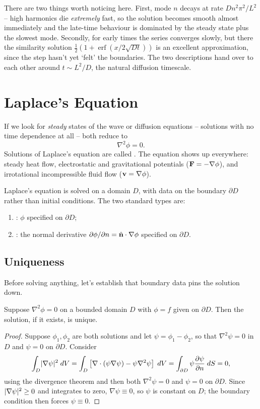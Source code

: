 \documentclass[a4paper]{scrartcl}
\newcommand{\erf}{\operatorname{erf}}
\begin{document}
There are two things worth noticing here. First, mode $n$ decays at rate $D n^2 \pi^2/L^2$ -- high harmonics die \emph{extremely} fast, so the solution becomes smooth almost immediately and the late-time behaviour is dominated by the steady state plus the slowest mode. Secondly, for early times the series converges slowly, but there the similarity solution $\frac{1}{2}\left(1 + \erf \left(x/2\sqrt{Dt}\right)\right)$ is an excellent approximation, since the step hasn't yet `felt' the boundaries. The two descriptions hand over to each other around $t \sim L^2/D$, the natural diffusion timescale.

\section{Laplace's Equation}

If we look for \emph{steady} states of the wave or diffusion equations -- solutions with no time dependence at all -- both reduce to 
$$
\nabla^2 \phi = 0.
$$
Solutions of Laplace's equation are called . The equation shows up everywhere: steady heat flow, electrostatic and gravitational potentials ($\mathbf{F} = -\nabla \phi$), and irrotational incompressible fluid flow ($\mathbf{v} = \nabla \phi$).

Laplace's equation is solved on a domain $D$, with data on the boundary $\partial D$ rather than initial conditions. The two standard types are:
\begin{enumerate}[label=(\roman*)]
    \item {}: $\phi$ specified on $\partial D$;
    \item {}: the normal derivative $\partial \phi / \partial n = \hat{\mathbf{n}} \cdot \nabla \phi$ specified on $\partial D$.
\end{enumerate}

\subsection{Uniqueness}

Before solving anything, let's establish that boundary data pins the solution down.

\begin{theorem}
    Suppose $\nabla^2 \phi = 0$ on a bounded domain $D$ with $\phi = f$ given on $\partial D$. Then the solution, if it exists, is unique.
\end{theorem}
\begin{proof}
    Suppose $\phi_1, \phi_2$ are both solutions and let $\psi = \phi_1 - \phi_2$, so that $\nabla^2 \psi = 0$ in $D$ and $\psi = 0$ on $\partial D$.
    Consider
    $$
    \int_D \lvert\nabla \psi\rvert^2 \; d V = \int_D \left[\nabla \cdot (\psi \nabla \psi) - \psi \nabla^2 \psi \right]\; d V = \int_{\partial D} \psi \frac{\partial \psi}{\partial n} \; d S = 0,
    $$
    using the divergence theorem and then both $\nabla^2 \psi = 0$ and $\psi = 0$ on $\partial D$.
    Since $\lvert\nabla \psi\rvert^2 \geq 0$ and integrates to zero, $\nabla \psi \equiv 0$, so $\psi$ is constant on $D$; the boundary condition then forces $\psi \equiv 0$.
\end{proof}
\end{document}
